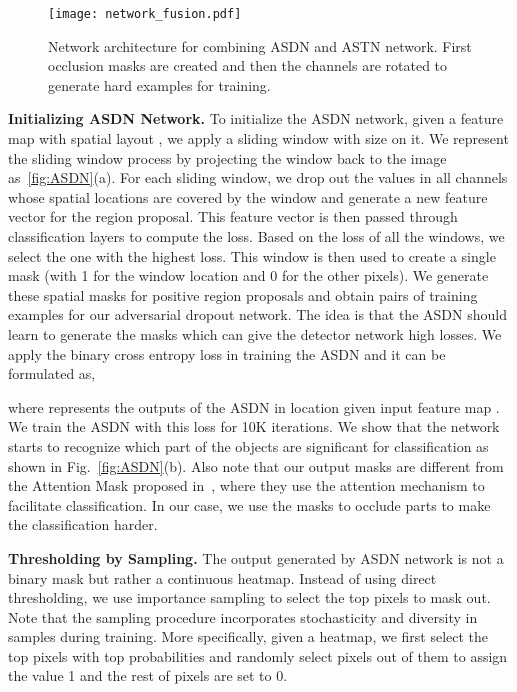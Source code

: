 \documentclass[10pt,twocolumn,letterpaper]{article}
\begin{document}
\begin{figure*}[t]
    \centering
    \texttt{[image: network\_fusion.pdf]}
    \caption{Network architecture for combining ASDN and ASTN network. First occlusion masks are created and then the channels are rotated to generate hard examples for training.}\label{fig:network_fusion}
\end{figure*}

\textbf{Initializing ASDN Network.} To initialize the ASDN network, given a feature map  with spatial layout , we apply a sliding window with size  on it. We represent the sliding window process by projecting the window back to the image as~\ref{fig:ASDN}(a). For each sliding window, we drop out  the values in all channels whose spatial locations are covered by the window and generate a new feature vector for the region proposal. This feature vector is then passed through classification layers to compute the loss. Based on the loss of all the   windows, we select the one with the highest loss. This window is then used to create a single  mask (with 1 for the window location and 0 for the other pixels). We generate these spatial masks for  positive region proposals and obtain  pairs of training examples   for our adversarial dropout network. The idea is that the ASDN should learn to generate the masks which can give the detector network high losses. We apply the binary cross entropy loss in training the ASDN and it can be formulated as,
{\small

}
where  represents the outputs of the ASDN in location  given input feature map . We train the ASDN with this loss for 10K iterations. We show that the network starts to recognize which part of the objects are significant for classification as shown in Fig.~\ref{fig:ASDN}(b). Also note that our output masks are different from the Attention Mask proposed in~\cite{ruslanattention}, where they use the attention mechanism to facilitate classification. In our case, we use the masks to occlude parts to make the classification harder. 




\textbf{Thresholding by Sampling.} The output generated by ASDN network is not a binary mask but rather a continuous heatmap. Instead of using direct  thresholding, we use importance sampling to select the top  pixels to mask out. Note that the sampling procedure incorporates stochasticity and diversity in samples during training. More specifically, given a heatmap, we first select the top  pixels with top probabilities and randomly select  pixels out of them to assign the value 1 and the rest of  pixels are set to 0. 
\end{document}
